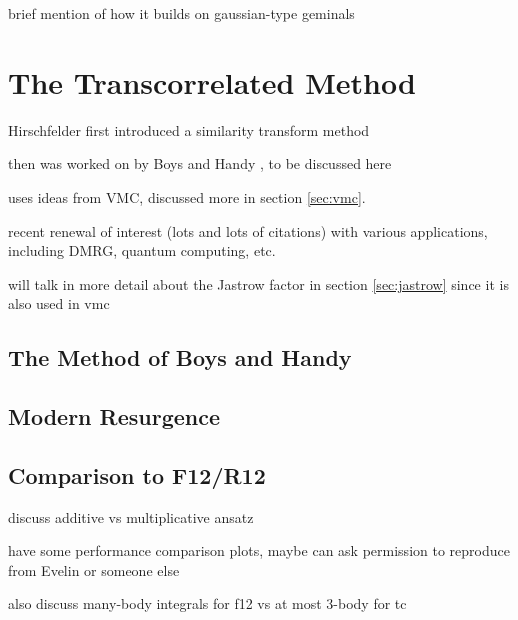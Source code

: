 brief mention of how it builds on gaussian-type geminals




\section{The Transcorrelated Method}
\label{sec:tc}

Hirschfelder first introduced a similarity transform method \cite{hirschfelderRemoval1963}

then was worked on by Boys and Handy , to be discussed here

uses ideas from \gls{VMC}, discussed more in section \ref{sec:vmc}.

recent renewal of interest (lots and lots of citations) with various applications, including DMRG, quantum computing, etc.

will talk in more detail about the Jastrow factor in section \ref{sec:jastrow} since it is also used in vmc




\subsection{The Method of Boys and Handy}

\subsection{Modern Resurgence}


\subsection{Comparison to F12/R12}

discuss additive vs multiplicative ansatz

have some performance comparison plots, maybe can ask permission to reproduce from Evelin or someone else

also discuss many-body integrals for f12 vs at most 3-body for tc


